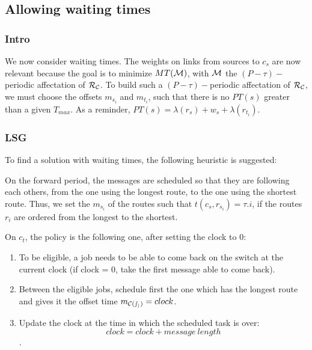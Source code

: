 \documentclass[a4paper,10pt]{article}
\begin{document}
   \subsection{Allowing waiting times}
   
     \subsubsection{Intro}
	  We now consider waiting times. The weights on links from sources to $c_s$ are now relevant because the goal is to minimize $MT({\cal M})$, with ${\cal M}$ the $(P-\tau)-$periodic affectation of ${\cal R_{\cal C}}$.
	  To build such a $(P-\tau)-$periodic affectation of ${\cal R_{\cal C}}$, we must choose the offsets $m_{s_i}$ and $m_{t_i}$, such that there is no $PT(s)$ greater than a given $T_{max}$.
	  As a reminder, $ PT(s)=\lambda(r_s)+ w_s+\lambda(r_{t_i})$.
     \subsubsection{LSG}
     

To find a solution with waiting times, the following heuristic is suggested:

On the forward period, the messages are scheduled so that they are following each others, from the one using the longest route, to the one using the shortest route. Thus, we set the $m_{s_i}$ of the routes such that  $t(c_s,r_{s_i}) = \tau.i$, if the routes $r_i$ are ordered from the longest to the shortest.

On $c_t$, the policy is the following one, after setting the clock to 0:
\begin{enumerate}
 \item To be eligible, a job needs to be able to come back on the switch at the current clock (if clock = 0, take the first message able to come back).
 \item Between the eligible jobs, schedule first the one which has the longest route and gives it the offset time $m_{\cal C(s_i)} = clock$.
 \item Update the clock at the time in which the scheduled task is over: $$clock = clock + message\ length$$.
\end{enumerate}
\end{document}
